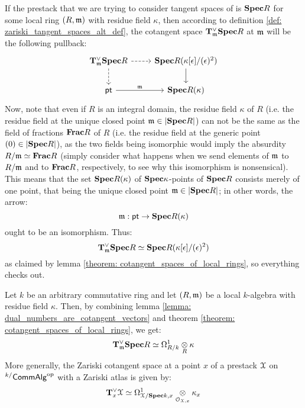             \begin{remark}
                If the prestack that we are trying to consider tangent spaces of is $\mathbf{Spec} R$ for some local ring $(R, \mathfrak{m})$ with residue field $\kappa$, then according to definition \ref{def: zariski_tangent_spaces_alt_def}, the cotangent space $\mathbf{T}^{\vee}_{\mathfrak{m}}\mathbf{Spec} R$ at $\mathfrak{m}$ will be the following pullback:
                    $$
                        \begin{tikzcd}
                        	{\bfT^{\vee}_{\m}\Spec R} & {\Spec R(\kappa[\e]/(\e)^2)} \\
                        	\pt & {\Spec R(\kappa)}
                        	\arrow[from=1-2, to=2-2]
                        	\arrow["\m", from=2-1, to=2-2]
                        	\arrow[dashed, from=1-1, to=2-1]
                        	\arrow[dashed, from=1-1, to=1-2]
                        \end{tikzcd}
                    $$
                Now, note that even if $R$ is an integral domain, the residue field $\kappa$ of $R$ (i.e. the residue field at the unique closed point $\mathfrak{m} \in |\mathbf{Spec} R|$) can not be the same as the field of fractions $\mathbf{Frac} R$ of $R$ (i.e. the residue field at the generic point $(0) \in |\mathbf{Spec} R|$), as the two fields being isomorphic would imply the absurdity $R/\mathfrak{m} \simeq \mathbf{Frac} R$ (simply consider what happens when we send elements of $\mathfrak{m}$ to $R/\mathfrak{m}$ and to $\mathbf{Frac} R$, respectively, to see why this isomorphism is nonsensical). This means that the set $\mathbf{Spec} R(\kappa)$ of $\mathbf{Spec} \kappa$-points of $\mathbf{Spec} R$ consists merely of one point, that being the unique closed point $\mathfrak{m} \in |\mathbf{Spec} R|$; in other words, the arrow:
                    $$\mathfrak{m}: \mathsf{pt} \to \mathbf{Spec} R(\kappa)$$
                ought to be an isomorphism. Thus:
                    $$\mathbf{T}^{\vee}_{\mathfrak{m}}\mathbf{Spec} R \simeq \mathbf{Spec} R(\kappa[\epsilon]/(\epsilon)^2)$$
                as claimed by lemma \ref{theorem: cotangent_spaces_of_local_rings}, so everything checks out.
            \end{remark}
            \begin{remark} 
                Let $k$ be an arbitrary commutative ring and let $(R, \mathfrak{m})$ be a local $k$-algebra with residue field $\kappa$. Then, by combining lemma \ref{lemma: dual_numbers_are_cotangent_vectors} and theorem \ref{theorem: cotangent_spaces_of_local_rings}, we get:
                    $$\bfT^{\vee}_{\m}\Spec R \cong \Omega^1_{R/k} \tensor_R \kappa$$
                More generally, the Zariski cotangent space at a point $x$ of a prestack $\mathcal{X}$ on ${}^{k/}\mathsf{Comm}\mathsf{Alg}^{\mathrm{op}}$ with a Zariski atlas is given by:
                    $$\bfT^{\vee}_x\calX \cong \Omega^1_{\calX/\Spec k, x} \tensor_{\calO_{\calX, x}} \kappa_x$$
            \end{remark}
            
